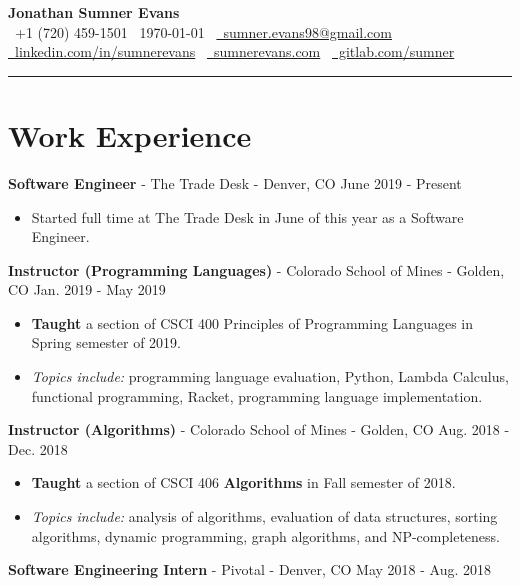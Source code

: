 \documentclass[10pt,letterpaper]{article}
\begin{document}
\begin{center}
    {\huge\textbf{Jonathan Sumner Evans}} \\
    \vspace{3pt}
    \faPhone\ +1 (720) 459-1501
    \textbar\ \today
    \textbar\ \href{mailto:sumner.evans98@gmail.com}{\faEnvelope\ sumner.evans98@gmail.com} \\
    \href{https://www.linkedin.com/in/sumnerevans}{\faLinkedin\ linkedin.com/in/sumnerevans}
    \textbar\ \href{https://sumnerevans.com}{\faGlobe\ sumnerevans.com}
    \textbar\ \href{https://gitlab.com/sumner}{\faGitlab\ gitlab.com/sumner}
    \rule{\textwidth}{0.5pt}
\end{center}

\section*{Work Experience}
\textbf{Software Engineer} - The Trade Desk - Denver, CO
\hfill June 2019 - Present
\begin{itemize}
    \item Started full time at The Trade Desk in June of this year as a Software
        Engineer.
\end{itemize}

\textbf{Instructor (Programming Languages)} - Colorado School of Mines - Golden, CO
\hfill Jan. 2019 - May 2019
\begin{itemize}
    \item \textbf{Taught} a section of CSCI 400 Principles of Programming
        Languages in Spring semester of 2019.
    \item \textit{Topics include:} programming language evaluation, Python,
        Lambda Calculus, functional programming, Racket, programming language
        implementation.
\end{itemize}

\textbf{Instructor (Algorithms)} - Colorado School of Mines - Golden, CO
\hfill Aug. 2018 - Dec. 2018
\begin{itemize}
    \item \textbf{Taught} a section of CSCI 406 \textbf{Algorithms} in Fall
        semester of 2018.
    \item \textit{Topics include:} analysis of algorithms, evaluation of data
        structures, sorting algorithms, dynamic programming, graph algorithms,
        and NP-completeness.
\end{itemize}

\textbf{Software Engineering Intern} - Pivotal - Denver, CO
\hfill May 2018 - Aug. 2018
\end{document}
